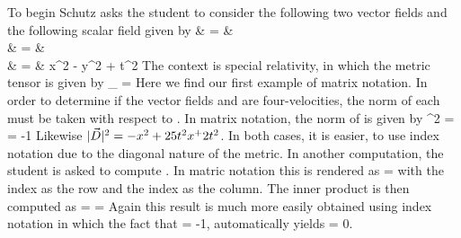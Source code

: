 \documentclass[12pt]{article}
\begin{document}
To begin Schutz asks the student to consider the following two vector fields and the
following scalar field given by
\bea
   & = &  \nonumber \\
   & = &    \nonumber \\
  \gr    & = & x^2 - y^2 + t^2 \eqp
\eea
The context is special relativity, in which the metric tensor is given by
\be
  \get_{\gm\gn} =  \eqp
\ee
Here we find our first example of matrix notation.  In order to determine if the
vector fields  and  are four-velocities, the norm of each must be
taken with respect to \idx{\get}{\dn{\gm\gn}}.  In matrix notation, the norm
of  is given by
\be
  \vert {} \vert ^2 = 
                        = -1 \eqp
\ee
Likewise $\vert \vec {D} \vert^2 = -x^2 + 25 t^2 x^ + 2t^2$.  In both cases, it is easier,
to use index notation due to the diagonal nature of the metric.
In another computation, the student is asked to compute .  In
matric notation this is rendered as
\be
   = 
\ee
with the \ga index as the row and the \gb index as the column.
The inner product   is then computed as
\be
{}  =
 =  \eqp
\ee
Again this result is much more easily obtained using index notation in which the
fact that   = -1, automatically yields
  = 0.
\end{document}
